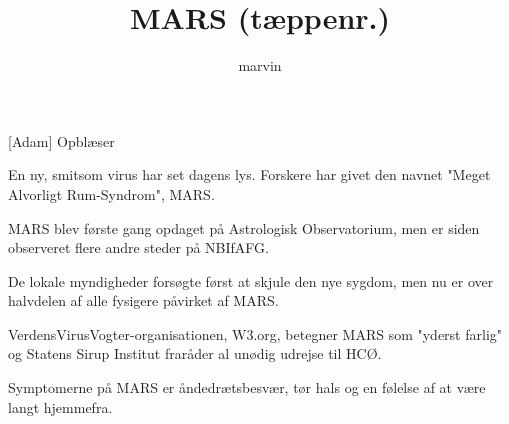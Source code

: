 \documentclass[a4paper,11pt]{article}
\title{MARS (tæppenr.)}
\author{marvin}
\begin{document}
\maketitle

\begin{roles}
[Adam] Opblæser
\end{roles}

\begin{props}
\end{props}

  
\begin{sketch}

En ny, smitsom virus har set dagens lys. Forskere har givet den navnet 
"Meget Alvorligt Rum-Syndrom", MARS.

MARS blev første gang opdaget på Astrologisk Observatorium, men er siden 
observeret flere andre steder på NBIfAFG.

De lokale myndigheder forsøgte først at skjule den nye sygdom, men nu er 
over halvdelen af alle fysigere påvirket af MARS.

VerdensVirusVogter-organisationen, W3.org, betegner MARS som "yderst 
farlig" og Statens Sirup Institut fraråder al unødig udrejse til HCØ.

Symptomerne på MARS er åndedrætsbesvær, tør hals og en følelse af at 
være langt hjemmefra.


\end{sketch}
\end{document}
